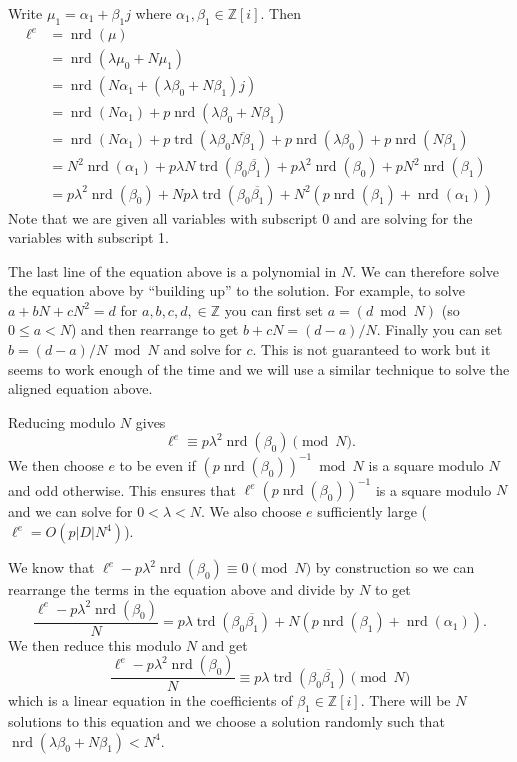 \documentclass[10pt]{article}
\theoremstyle{plain}
\theoremstyle{definition}
\newcommand{\op}{\operatorname}
\newcommand{\Z}{\mathbb{Z}}
\newcommand{\nrd}{\op{nrd}}
\newcommand{\trd}{\op{trd}}
\begin{document}
Write \( \mu_1 = \alpha_1 + \beta_1j \) where \( \alpha_1, \beta_1 \in \Z[i] \).
Then
\begin{align*}
    \ell^e
      & = \nrd(\mu)                                                                                                      \\
      & = \nrd(\lambda \mu_0 + N \mu_1)                                                                                  \\
      & = \nrd(N\alpha_1 + (\lambda\beta_0 + N\beta_1)j)                                                                 \\
      & = \nrd(N\alpha_1) +p\nrd(\lambda\beta_0 + N\beta_1)                                                              \\
      & = \nrd(N\alpha_1) + p\trd(\lambda \beta_0\overline{N\beta_1}) + p\nrd(\lambda\beta_0) + p\nrd(N\beta_1)          \\
      & = N^2\nrd(\alpha_1) +  p\lambda N \trd(\beta_0\overline{\beta_1}) + p\lambda^2 \nrd(\beta_0) + pN^2\nrd(\beta_1) \\
      & = p\lambda^2 \nrd(\beta_0) + Np\lambda \trd(\beta_0\overline{\beta_1}) + N^2(p\nrd(\beta_1) + \nrd(\alpha_1))
\end{align*}
Note that we are given all variables with subscript 0 and are solving for the variables with subscript 1.

The last line of the equation above is a polynomial in \( N \).
We can therefore solve the equation above by ``building up'' to the solution.
For example, to solve \( a + bN + cN^2 = d \) for \( a, b, c, d, \in \Z \) you can first set \( a = (d \bmod{N}) \) (so \( 0\leq a < N \)) and then rearrange to get \( b + cN = (d-a) / N \).
Finally you can set \( b = (d-a) / N \bmod{N} \) and solve for \( c \).
This is not guaranteed to work but it seems to work enough of the time and we will use a similar technique to solve the aligned equation above.

Reducing modulo \( N \) gives
\[
    \ell^e \equiv p\lambda^2\nrd(\beta_0) \pmod{N}.
\]
We then choose \( e \) to be even if \( (p\nrd(\beta_0))^{-1} \bmod{N} \) is a square modulo \( N \) and odd otherwise.
This ensures that \( \ell^e(p\nrd(\beta_0))^{-1} \) is a square modulo \( N \) and we can solve for \( 0 <  \lambda < N\).
We also choose \( e \) sufficiently large (\( \ell^e = O(p|D|N^4) \)).

We know that \( \ell^e - p\lambda^2 \nrd(\beta_0) \equiv 0 \pmod{N} \) by construction so we can rearrange the terms in the equation above and divide by \( N \) to get
\[
    \frac{\ell^e - p\lambda^2 \nrd(\beta_0)}{N} = p\lambda \trd(\beta_0\overline{\beta_1}) + N(p\nrd(\beta_1) + \nrd(\alpha_1)).
\]
We then reduce this modulo \( N \) and get
\[
    \frac{\ell^e - p\lambda^2\nrd(\beta_0)}{N}\equiv p\lambda \trd(\beta_0\overline{\beta_1}) \pmod{N}
\]
which is a linear equation in the coefficients of \( \beta_1 \in \Z[i]\).
There will be \( N \) solutions to this equation and we choose a solution randomly such that \( \nrd(\lambda\beta_0 + N\beta_1) < N^4 \).
\end{document}
